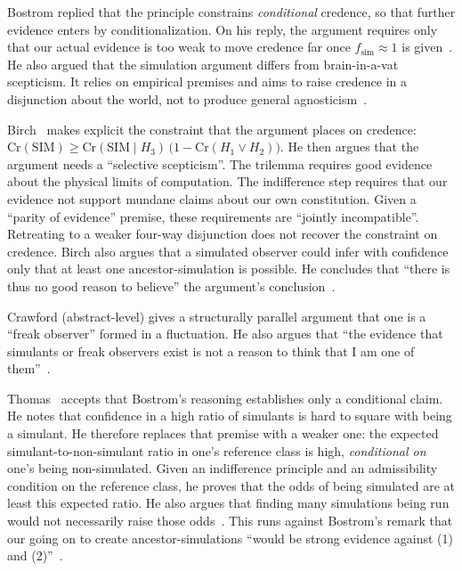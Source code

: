 Bostrom replied that the principle constrains \emph{conditional} credence, so that
further evidence enters by conditionalization. On his reply, the argument requires only
that our actual evidence is too weak to move credence far once
$f_{\mathrm{sim}}\approx 1$ is given~\cite[\S\,2]{Bostrom2005simulation}. He also argued
that the simulation argument differs from brain-in-a-vat scepticism. It relies on
empirical premises and aims to raise credence in a disjunction about the world, not to
produce general agnosticism~\cite[\S\,4]{Bostrom2005simulation}.

Birch~\cite{Birch2013on} makes explicit the constraint that the argument places on
credence:
$\mathrm{Cr}(\mathrm{SIM}) \ge \mathrm{Cr}(\mathrm{SIM}\mid H_3)\,
\bigl(1-\mathrm{Cr}(H_1\vee H_2)\bigr)$.
He then argues that the argument needs a ``selective scepticism''. The trilemma requires
good evidence about the physical limits of computation. The indifference step requires
that our evidence not support mundane claims about our own constitution. Given a
``parity of evidence'' premise, these requirements are ``jointly incompatible''.
Retreating to a weaker four-way disjunction does not recover the constraint on credence.
Birch also argues that a simulated observer could infer with confidence only that at
least one ancestor-simulation is possible. He concludes that ``there is thus no good
reason to believe'' the argument's conclusion~\cite{Birch2013on}.

Crawford (abstract-level) gives a structurally parallel argument that one is a ``freak
observer'' formed in a fluctuation. He also argues that ``the evidence that simulants or
freak observers exist is not a reason to think that I am one of them''~\cite{Crawford2013freak}.

Thomas~\cite{Thomas2026simulation} accepts that Bostrom's reasoning establishes only a
conditional claim. He notes that confidence in a high ratio of simulants is hard to
square with being a simulant. He therefore replaces that premise with a weaker one: the
expected simulant-to-non-simulant ratio in one's reference class is high,
\emph{conditional on} one's being non-simulated. Given an indifference principle and an
admissibility condition on the reference class, he proves that the odds of being
simulated are at least this expected ratio. He also argues that finding many simulations
being run would not necessarily raise those odds~\cite{Thomas2026simulation}. This
runs against Bostrom's remark that our going on to create ancestor-simulations ``would be
strong evidence against (1) and (2)''~\cite[\S\,VI]{Bostrom2003are}.

